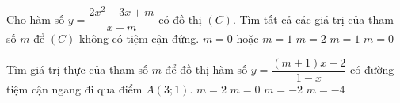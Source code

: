 \begin{ex}%
	Cho hàm số $y=\dfrac{2x^2-3x+m}{x-m}$ có đồ thị $(C)$. Tìm tất cả các giá trị của tham số $m$ để $(C)$ không có tiệm cận đứng. 
	\choice
	{\True $m=0$ hoặc $m=1$}
	{$m=2$}
	{$m=1$}
	{$m=0$}
\end{ex}
\begin{ex}%
	Tìm giá trị thực của tham số $m$ để đồ thị hàm số $y=\dfrac{(m+1)x-2}{1-x}$ có đường tiệm cận ngang đi qua điểm $A(3;1)$. 
	\choice
	{$m=2$}
	{$m=0$}
	{\True $m=-2$}
	{$m=-4$}
\end{ex}
